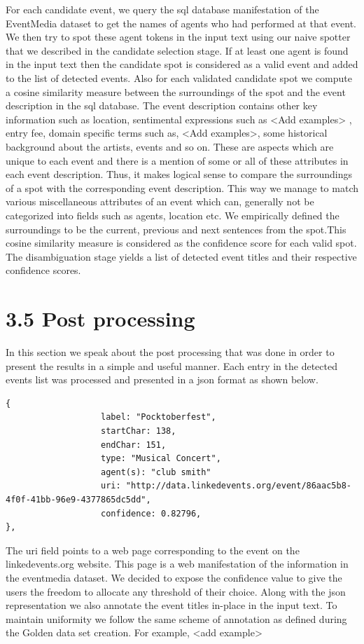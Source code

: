 \documentclass[a4paper,11pt]{report}
\begin{document}
For each candidate event, we query the sql database manifestation of the EventMedia dataset to get the names of agents who had performed at that event. We then try to spot these  agent tokens in the input text using our naive spotter that we described in the candidate selection stage. If at least one agent is found in the input text then the candidate spot is considered as a valid event and added to the list of detected events. Also for each validated candidate spot we compute a cosine similarity measure between the surroundings of the spot and the event description in the sql database. The event description contains other key information such as location, sentimental expressions such as <Add examples> , entry fee, domain specific terms such as, <Add examples>, some historical background about the artists, events and so on. These are aspects which are unique to each event and there is a mention of some or all of these attributes in each event description. Thus, it makes logical sense to compare the surroundings of a spot with the corresponding event description. This way we manage to match various miscellaneous attributes of an event which can, generally not be categorized into fields such as agents, location etc. We empirically defined the surroundings to be the current, previous and next sentences from the spot.This cosine similarity measure is considered as the confidence score for each valid spot. The disambiguation stage yields a list of detected event titles and their respective confidence scores.


\section*{3.5 Post processing}

In this section we speak about the post processing that was done in order to present the results in a simple and useful manner. Each entry in the detected events list was processed and presented in a json format as shown below.
\begin{lstlisting}
{
                   label: "Pocktoberfest",
                   startChar: 138,
                   endChar: 151,
                   type: "Musical Concert",
                   agent(s): "club smith"
                   uri: "http://data.linkedevents.org/event/86aac5b8-4f0f-41bb-96e9-4377865dc5dd",
                   confidence: 0.82796,
},
\end{lstlisting}
The uri field points to a web page corresponding to the event on the linkedevents.org website. This page is a  web manifestation of the information in the eventmedia dataset. We decided to expose the confidence value to give the users the freedom to allocate any threshold of their choice. Along with the json representation we also annotate the event titles in-place in the input text. To maintain uniformity we follow the same scheme of annotation as defined during the Golden data set creation. For example, <add example>
\end{document}
